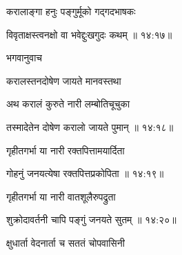 {\devanagarifont करालाङ्गा हनुः पङ्गुर्मूको गद्गदभाषकः \thinspace{\danda} \dontdisplaylinenum }%


{\devanagarifont विवृताक्षस्त्वनक्षो वा भवेद्दुःखगुदः कथम् {॥ १४:१७॥} \veg\dontdisplaylinenum }%

{\devanagarifont भगवानुवाच {\dandab}\dontdisplaylinenum  }%
 
{\devanagarifont करालस्तनदोषेण जायते मानवस्तथा \thinspace{\danda} \dontdisplaylinenum }%

{\devanagarifont अथ करालं कुरुते नारी लम्बोतिचूचुका  \danda\dontdisplaylinenum }%
 

{\devanagarifont तस्मादेतेन दोषेण करालो जायते पुमान् {॥ १४:१८॥} \veg\dontdisplaylinenum }%

{\devanagarifont गृहीतगर्भा या नारी रक्तपित्तामयार्दिता \thinspace{\dandab} \dontdisplaylinenum }%
 

{\devanagarifont गोहनुं जनयत्येषा रक्तपित्तप्रकोपिता {॥ १४:१९॥} \veg\dontdisplaylinenum }%

{\devanagarifont गृहीतगर्भा या नारी वातशूलैरुपद्रुता \thinspace{\dandab} \dontdisplaylinenum }%


{\devanagarifont शुक्रोदावर्तनी चापि पङ्गुं जनयते सुतम् {॥ १४:२०॥} \veg\dontdisplaylinenum }%

{\devanagarifont क्षुधार्ता वेदनार्ता च सततं चोपवासिनी \thinspace{\dandab} \dontdisplaylinenum }%

